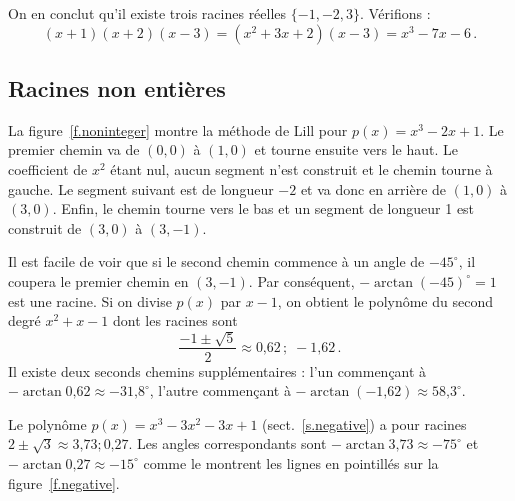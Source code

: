 On en conclut qu'il existe trois racines réelles $\{-1,-2,3\}$.
Vérifions :
\[
(x+1)(x+2)(x-3)=(x^2+3x+2)(x-3) =x^3-7x-6\,.
\]


\subsection{Racines non entières}\label{s.noninteger}

La figure~\ref{f.noninteger} montre la méthode de Lill pour $p(x)=x^3-2x+1$. Le premier chemin va de $(0,0)$ à $(1,0)$ et tourne ensuite vers le haut. Le coefficient de $x^2$ étant nul, aucun segment  n'est construit et le chemin tourne à gauche. Le segment  suivant est de longueur $-2$ et va donc en arrière de $(1,0)$ à $(3,0)$. Enfin, le chemin tourne vers le bas et un segment 
 de longueur 1 est construit de $(3,0)$ à $(3,-1)$.

Il est facile de voir que si le second chemin commence à un angle de $-45^\circ$, il coupera le premier chemin en  $(3,-1)$. Par conséquent, $-\arctan (-45)^\circ=1$ est une racine. Si on divise $p(x)$ par $x-1$, on obtient le polynôme du second degré $x^2+x-1$ dont les racines sont 
\[
\frac{-1\pm\sqrt{5}}{2} \approx \mbox{0,62}\,;\; -\mbox{1,62}\,.
\]
Il existe deux seconds chemins supplémentaires : l'un commençant à $-\arctan \mbox{0,62}\approx -\mbox{31,8}^\circ$,  l'autre commençant à $-\arctan(-\mbox{1,62})\approx \mbox{58,3}^\circ$.

Le polynôme $p(x)=x^3-3x^2-3x+1$ (sect.~\ref{s.negative}) a pour racines $ 2\pm\sqrt{3}\approx \mbox{3,73}; \mbox{0,27}$. Les angles correspondants sont $-\arctan \mbox{3,73} \approx -75^\circ$ et $-\arctan \mbox{0,27} \approx -15^\circ$ comme le montrent les lignes en pointillés sur la figure~\ref{f.negative}.


